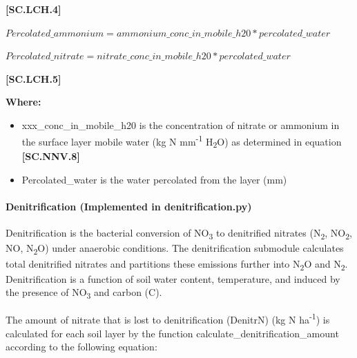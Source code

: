             {\raggedleft \textbf{[SC.LCH.4]}\par}
            \vspace{0.5cm}

\vspace{0.5cm}
            
    \begin{center}
 \(Percolated\_ammonium = ammonium\_conc\_in\_mobile\_h20  * percolated\_water\)
 \vspace{0.1cm}

  \(Percolated\_nitrate = nitrate\_conc\_in\_mobile\_h20  * percolated\_water\)
    \end{center}
        \vspace{0.5cm} 
    
            {\raggedleft \textbf{[SC.LCH.5]}\par}
            \vspace{0.5cm}

        \textbf{Where:}
            
        \begin{itemize}
            \item xxx\_conc\_in\_mobile\_h20 is the concentration of nitrate or ammonium in the surface layer mobile water (kg N mm\textsuperscript{-1} H\textsubscript{2}O) as determined in equation \textbf{[SC.NNV.8]}
            \item Percolated\_water is the water percolated from the layer (mm)

        \end{itemize}
    \vspace{0.2cm}

\paragraph{Denitrification (Implemented in denitrification.py)}
Denitrification is the bacterial conversion of NO\textsubscript{3} to denitrified nitrates (N\textsubscript{2}, NO\textsubscript{2}, NO, N\textsubscript{2}O) under anaerobic conditions. The denitrification submodule calculates total denitrified nitrates and partitions these emissions further into N\textsubscript{2}O and N\textsubscript{2}. Denitrification is a function of soil water content, temperature, and induced by the presence of NO\textsubscript{3} and carbon (C). 
\vspace{0.2cm}

The amount of nitrate that is lost to denitrification (DenitrN) (kg N ha\textsuperscript{-1}) is calculated for each soil layer by the function calculate\_denitrification\_amount according to the following equation:
\vspace{0.5cm}
            
